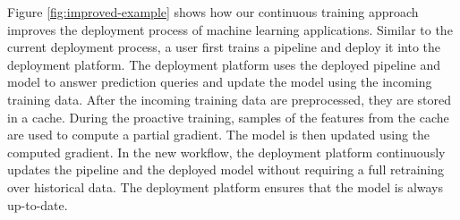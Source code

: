 Figure \ref{fig:improved-example} shows how our continuous training approach improves the deployment process of machine learning applications.
Similar to the current deployment process, a user first trains a pipeline and deploy it into the deployment platform.
The deployment platform uses the deployed pipeline and model to answer prediction queries and update the model using the incoming training data.
After the incoming training data are preprocessed, they are stored in a cache.
During the proactive training, samples of the features from the cache are used to compute a partial gradient.
The model is then updated using the computed gradient.
In the new workflow, the deployment platform continuously updates the pipeline and the deployed model without requiring a full retraining over historical data.
The deployment platform ensures that the model is always up-to-date.